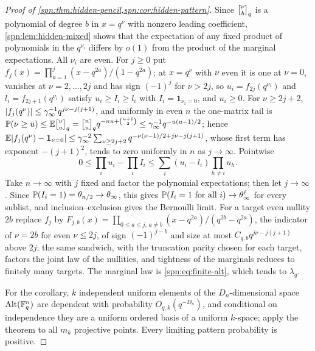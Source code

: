 \begin{proof}[Proof of \cref{spn:thm:hidden-pencil,spn:cor:hidden-pattern}]
Since $\spnqbin{\nu}{b}{q}$ is a polynomial of degree $b$ in $x=q^\nu$ with nonzero leading coefficient,
\cref{spn:lem:hidden-mixed} shows that the expectation of any fixed product of polynomials in the
$q^{\nu_i}$ differs by $o(1)$ from the product of the marginal expectations. All $\nu_i$ are even. For
$j\ge0$ put $f_j(x)=\prod_{a=1}^j(x-q^{2a})/(1-q^{2a})$; at $x=q^\nu$ with $\nu$ even it is one at
$\nu=0$, vanishes at $\nu=2,\dots,2j$ and has sign $(-1)^j$ for $\nu>2j$, so $u_i=f_{2j}(q^{\nu_i})$
and $l_i=f_{2j+1}(q^{\nu_i})$ satisfy $u_i\ge I_i\ge l_i$ with $I_i=\mathbf 1_{\nu_i=0}$, and
$u_i\ge0$. For $\nu\ge2j+2$, $\lvert f_j(q^\nu)\rvert\le\gamma_\infty^{-1}q^{j\nu-j(j+1)}$, and uniformly in
even $n$ the one-matrix tail is $\spnP(\nu\ge u)\le\spnE\spnqbin{\nu}{u}{q}=\spnqbin nu{q}
q^{-nu+\binom{u+1}2}\le\gamma_\infty^{-1}q^{-u(u-1)/2}$; hence
$\mathbb{E}\lvert f_j(q^\nu)-\mathbf 1_{\nu=0}\rvert\le\gamma_\infty^{-2}\sum_{\nu\ge2j+2}q^{-\nu(\nu-1)/2+j\nu-j(j+1)}$,
whose first term has exponent $-(j+1)^2$, tends to zero uniformly in $n$ as $j\to\infty$. Pointwise
\[
 0\le\prod_iu_i-\prod_iI_i\le\sum_i(u_i-l_i)\prod_{h\ne i}u_h.
\]
Take $n\to\infty$ with $j$ fixed and factor the polynomial expectations; then let $j\to\infty$. Since
$\mathbb{P}(I_i=1)=\theta_{n/2}\to\theta_\infty$, this gives $\mathbb{P}(I_i=1\text{ for all }i)\to\theta_\infty^\ell$
for every sublist, and inclusion--exclusion gives the Bernoulli limit. For a target even nullity $2b$
replace $f_j$ by $F_{j,b}(x)=\prod_{0\le a\le j,\,a\ne b}(x-q^{2a})/(q^{2b}-q^{2a})$, the indicator of
$\nu=2b$ for even $\nu\le2j$, of sign $(-1)^{j-b}$ and size at most $C_{q,b}q^{j\nu-j(j+1)}$ above
$2j$; the same sandwich, with the truncation parity chosen for each target, factors the joint law of
the nullities, and tightness of the marginals reduces to finitely many targets. The marginal law is
\eqref{spn:eq:finite-alt}, which tends to $\lambda_q$.

For the corollary, $k$ independent uniform elements of the $D_n$-dimensional space
$\operatorname{Alt}(\mathbb{F}_q^n)$ are dependent with probability $O_{q,k}(q^{-D_n})$, and conditional on independence
they are a uniform ordered basis of a uniform $k$-space; apply the theorem to all $m_k$ projective
points. Every limiting pattern probability is positive.
\end{proof}

